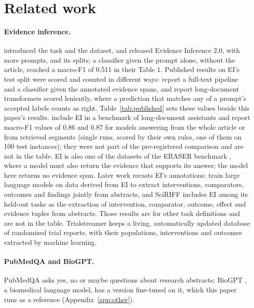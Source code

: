 \documentclass[11pt,letterpaper]{article}
\begin{document}
\section{Related work}
\label{sec:related}

\paragraph{Evidence inference.} \citet{lehman2019} introduced the task and the dataset, and \citet{deyoung2020} released Evidence Inference 2.0, with more prompts, and its splits; a classifier given the prompt alone, without the article, reached a macro-F1 of 0.511 in their Table 1. Published results on EI's test split were scored and counted in different ways: \citet{deyoung2020} report a full-text pipeline and a classifier given the annotated evidence spans, and \citet{buchmann2024structure} report long-document transformers scored leniently, where a prediction that matches any of a prompt's accepted labels counts as right. Table~\ref{tab:published} sets these values beside this paper's results. \citet{buchmann2024lab} include EI in a benchmark of long-document assistants and report macro-F1 values of 0.86 and 0.87 for models answering from the whole article or from retrieved segments (single runs, scored by their own rules, one of them on 100 test instances); they were not part of the pre-registered comparison and are not in the table. EI is also one of the datasets of the ERASER benchmark \citep{deyoung2020eraser}, where a model must also return the evidence that supports its answer; the model here returns no evidence span. Later work recasts EI's annotations: \citet{wadhwa2023} train large language models on data derived from EI to extract interventions, comparators, outcomes and findings jointly from abstracts, and SciRIFF \citep{wadden2025} includes EI among its held-out tasks as the extraction of intervention, comparator, outcome, effect and evidence tuples from abstracts. Those results are for other task definitions and are not in the table. Trialstreamer \citep{marshall2020} keeps a living, automatically updated database of randomized trial reports, with their populations, interventions and outcomes extracted by machine learning.

\paragraph{PubMedQA and BioGPT.} PubMedQA \citep{jin2019} asks yes, no or maybe questions about research abstracts; BioGPT \citep{luo2022}, a biomedical language model, has a version fine-tuned on it, which this paper runs as a reference (Appendix~\ref{app:other}).
\end{document}
